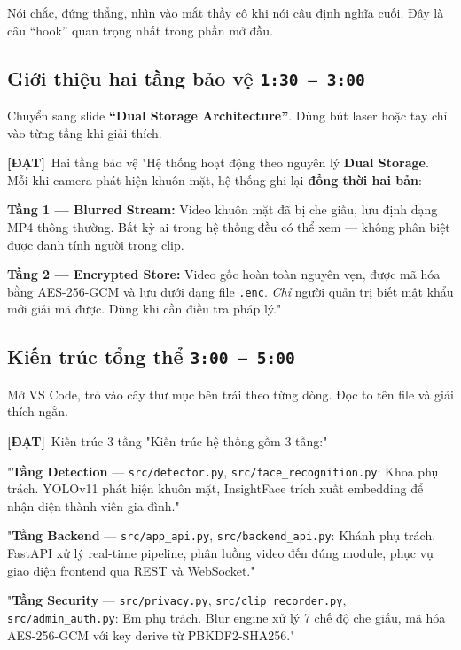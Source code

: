 \documentclass[12pt, a4paper]{article}
\newcommand{\timing}[1]{%
  \hfill\colorbox{NavyBlue!20}{\texttt{\small #1}}%
}
\newcommand{\dat}{\textcolor{BrickRed}{\textbf{[ĐẠT]}}}
\begin{document}
\begin{note}
Nói chắc, đứng thẳng, nhìn vào mắt thầy cô khi nói câu định nghĩa cuối.
Đây là câu ``hook'' quan trọng nhất trong phần mở đầu.
\end{note}

\subsection{Giới thiệu hai tầng bảo vệ \timing{1:30 – 3:00}}

\begin{action}
Chuyển sang slide \textbf{``Dual Storage Architecture''}.
Dùng bút laser hoặc tay chỉ vào từng tầng khi giải thích.
\end{action}

\begin{dialog}{\dat\ Hai tầng bảo vệ}
"Hệ thống hoạt động theo nguyên lý \textbf{Dual Storage}.
Mỗi khi camera phát hiện khuôn mặt, hệ thống ghi lại \textbf{đồng thời hai bản}:

\vspace{0.5em}
\textbf{Tầng 1 --- Blurred Stream:}
Video khuôn mặt đã bị che giấu, lưu định dạng MP4 thông thường.
Bất kỳ ai trong hệ thống đều có thể xem --- không phân biệt được danh tính người trong clip.

\vspace{0.5em}
\textbf{Tầng 2 --- Encrypted Store:}
Video gốc hoàn toàn nguyên vẹn, được mã hóa bằng AES-256-GCM
và lưu dưới dạng file \texttt{.enc}.
\textit{Chỉ} người quản trị biết mật khẩu mới giải mã được.
Dùng khi cần điều tra pháp lý."
\end{dialog}

\subsection{Kiến trúc tổng thể \timing{3:00 – 5:00}}

\begin{action}
Mở VS Code, trỏ vào cây thư mục bên trái theo từng dòng.
Đọc to tên file và giải thích ngắn.
\end{action}

\begin{dialog}{\dat\ Kiến trúc 3 tầng}
"Kiến trúc hệ thống gồm 3 tầng:"

\vspace{0.5em}
"\textbf{Tầng Detection} --- \texttt{src/detector.py}, \texttt{src/face\_recognition.py}:
Khoa phụ trách. YOLOv11 phát hiện khuôn mặt, InsightFace trích xuất embedding
để nhận diện thành viên gia đình."

\vspace{0.5em}
"\textbf{Tầng Backend} --- \texttt{src/app\_api.py}, \texttt{src/backend\_api.py}:
Khánh phụ trách. FastAPI xử lý real-time pipeline,
phân luồng video đến đúng module, phục vụ giao diện frontend qua REST và WebSocket."

\vspace{0.5em}
"\textbf{Tầng Security} --- \texttt{src/privacy.py}, \texttt{src/clip\_recorder.py}, \texttt{src/admin\_auth.py}:
Em phụ trách. Blur engine xử lý 7 chế độ che giấu,
mã hóa AES-256-GCM với key derive từ PBKDF2-SHA256."
\end{dialog}
\end{document}
